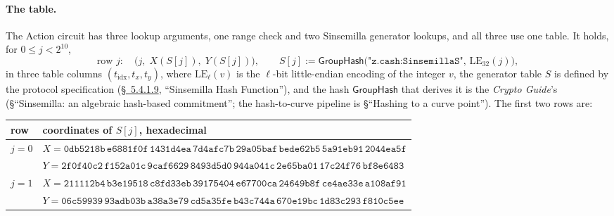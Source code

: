 \documentclass[11pt,a4paper]{article}
\theoremstyle{definition}
\newcommand{\GroupHash}{\ensuremath{\mathsf{GroupHash}}}
\begin{document}
\paragraph{The table.}
The Action circuit has three lookup arguments, one range check and two
Sinsemilla generator lookups, and all three use one table. It holds, for
$0 \le j < 2^{10}$,
\[
\text{row } j:\quad \bigl(j,\; X(S[j]),\; Y(S[j])\bigr), \qquad
S[j] := \GroupHash\bigl(\texttt{"z.cash:SinsemillaS"},\,
  \mathrm{LE}_{32}(j)\bigr),
\]
in three table columns $(t_{\mathrm{idx}}, t_x, t_y)$, where
$\mathrm{LE}_{\ell}(v)$ is the $\ell$-bit little-endian encoding of the
integer $v$, the generator table $S$ is defined by the protocol
specification
(\href{https://zips.z.cash/protocol/protocol.pdf\#concretesinsemillahash}%
{\S~5.4.1.9}, ``Sinsemilla Hash Function''), and the hash $\GroupHash$
that derives it is the \emph{Crypto Guide}'s (\S``Sinsemilla: an
algebraic hash-based commitment''; the hash-to-curve pipeline is
\S``Hashing to a curve point'').
The first two rows are:
\begin{center}
\footnotesize
\begin{tabular}{l l}
\toprule
row & coordinates of $S[j]$, hexadecimal \\
\midrule
$j = 0$ & $X = \mathtt{0db5218b\,e6881f0f\,1431d4ea\,7d4afc7b\,
                        29a05baf\,bede62b5\,5a91eb91\,2044ea5f}$ \\
        & $Y = \mathtt{2f0f40c2\,f152a01c\,9caf6629\,8493d5d0\,
                        944a041c\,2e65ba01\,17c24f76\,bf8e6483}$ \\
$j = 1$ & $X = \mathtt{211112b4\,b3e19518\,c8fd33eb\,39175404\,
                        e67700ca\,24649b8f\,ce4ae33e\,a108af91}$ \\
        & $Y = \mathtt{06c59939\,93adb03b\,a38a3e79\,cd5a35fe\,
                        b43c744a\,670e19bc\,1d83c293\,f810c5ee}$ \\
\bottomrule
\end{tabular}
\end{center}
\end{document}

